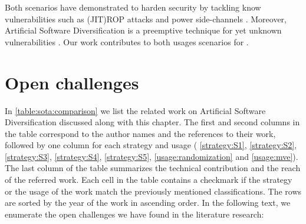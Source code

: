 %

Both scenarios have demonstrated to harden security by tackling know vulnerabilities such as (JIT)ROP attacks \cite{jackson2011compiler} and power side-channels \cite{amarilli2011can}. Moreover, Artificial Software Diversification is a preemptive technique for yet unknown vulnerabilities \cite{jackson}. Our work contributes to both usages scenarios for \wasm.



\section{Open challenges}
\label{sota:openchallenges}

In \autoref{table:sota:comparison} we list the related work on Artificial Software Diversification discussed along with this chapter. The first and second columns in the table correspond to the author names and the references to their work, followed by one column for each strategy and usage ( \autoref{strategy:S1},  \autoref{strategy:S2},  \autoref{strategy:S3},  \autoref{strategy:S4},  \autoref{strategy:S5}, \autoref{usage:randomization} and \autoref{usage:mve}). The last column of the table summarizes the technical contribution and the reach of the referred work. Each cell in the table contains a checkmark if the strategy or the usage of the work match the previously mentioned classifications. The rows are sorted by the year of the work in ascending order. 
In the following text, we enumerate the open challenges we have found in the literature research:

